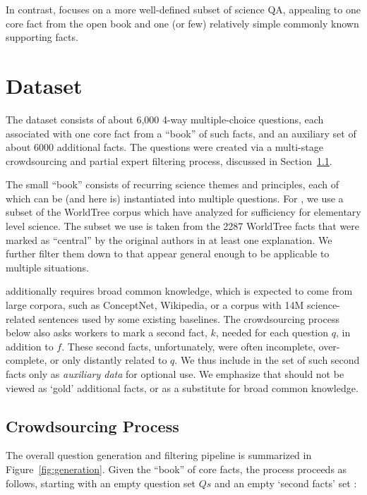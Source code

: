 In contrast, \obqa focuses on a more well-defined subset of science QA, appealing to one core fact from the open book and one (or few) relatively simple commonly known supporting facts.

\section{\obqa Dataset}
\label{sec:dataset}

The \obqa dataset consists of about 6,000 4-way multiple-choice questions, each associated with one core fact from a ``book'' \Fs of \factsize such facts, and an auxiliary set \Ks of about 6000 additional facts. The questions were created via a multi-stage crowdsourcing and partial expert filtering process, discussed in Section~\ref{subsec:process}.

The small ``book'' \Fs consists of recurring science themes and principles, each of which can be (and here is) instantiated into multiple questions. For \Fs, we use a subset of the WorldTree corpus which \citet{Jansen2018WorldTreeAC} have analyzed for sufficiency for elementary level science. The subset we use is taken from the 2287 WorldTree facts that were marked as ``central'' by the original authors in at least one explanation. We further filter them down to \factsize that appear general enough to be applicable to multiple situations.

\obqa additionally requires broad common knowledge, which is expected to come from large corpora, such as ConceptNet, Wikipedia, or a corpus with 14M science-related sentences used by some existing baselines. The crowdsourcing process below also asks workers to mark a second fact, $k$, needed for each question $q$, in addition to $f$. These second facts, unfortunately, were often incomplete, over-complete, or only distantly related to $q$. We thus include in \obqa the set \Ks of such second facts only as \emph{auxiliary data} for optional use. We emphasize that \Ks should not be viewed as `gold' additional facts, or as a substitute for broad common knowledge.

\subsection{Crowdsourcing Process}
\label{subsec:process}

The overall question generation and filtering pipeline is summarized in Figure~\ref{fig:generation}. Given the ``book'' \Fs of core facts, the process proceeds as follows, starting with an empty question set $Qs$ and an empty `second facts' set \Ks:

